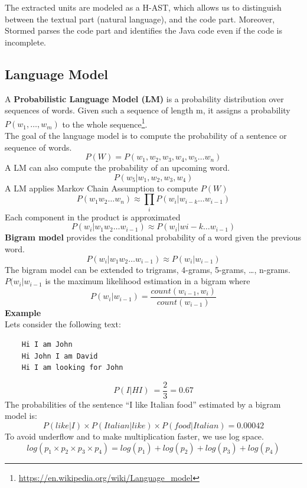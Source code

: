 \documentclass[12pt,mscthesis]{usiinfthesis}
\begin{document}

	The extracted units are modeled as a H-AST, which allows us to distinguish between the textual part (natural language), and the code part. Moreover, Stormed parses the code part and identifies the Java code even if the code is incomplete.

	\subsection{Language Model}

	A \textbf{Probabilistic Language Model (LM)} is a probability distribution over sequences of words. Given such a sequence of length m, it assigns a probability $P(w_{1},\ldots ,w_{m})$ to the whole sequence\footnote{\url{https://en.wikipedia.org/wiki/Language_model}}.\\
	The goal of the language model is to compute the probability of a sentence or sequence of words.
	\[P(W) = P(w_{1},w_2,w_3,w_4,w_5\dots w_n)\]
	A LM can also compute the probability of an upcoming word.
	\[P(w_5|w_1,w_2,w_3,w_4)\]
	A LM applies Markov Chain Assumption to compute $P(W)$
	\[P(w_1w_2\dots w_n) \approx \prod_{i} P(w_i|w_{i-k} \dots w_{i-1})\]
	Each component in the product is approximated
	\[P(w_i |w_1w_2\dots w_{i-1}) \approx P(w_i |w{i-k} \dots w_{i-1})\]
	\textbf{Bigram model} provides the conditional probability of a word given the previous word.
	\[P(w_i |w_1w_2 \dots w_{i-1})\approx P(w_i |w_{i-1})\]
	The bigram model can be extended to trigrams, 4-grams, 5-grams, \dots , n-grams.\\
	$P(w_i |w_{i-1}$ is the maximum likelihood estimation in a bigram where 
	\[P(w_{i}|w_{{i-1}})=\frac{count(w_{{i-1}},w_{i})} {count(w_{{i-1}})}\]
	\textbf{Example}\\
	Lets consider the following text:
	\begin{verbatim}
	Hi I am John
	Hi John I am David
	Hi I am looking for John
\end{verbatim}
	\[P(I|HI)\ = \frac{2}{3} = 0.67\]
	The probabilities of the sentence ``I like Italian food'' estimated by a bigram model is:
	\[P(like|I) \times P(Italian|like) \times P(food|Italian)= 0.00042\]
	To avoid underflow and to make multiplication faster, we use log space.
	\[log( p_1 \times p_2 \times p_3 \times p_4 ) = log (p_1) + log (p_2) + log (p_3) + log (p_4)\]
\end{document}
